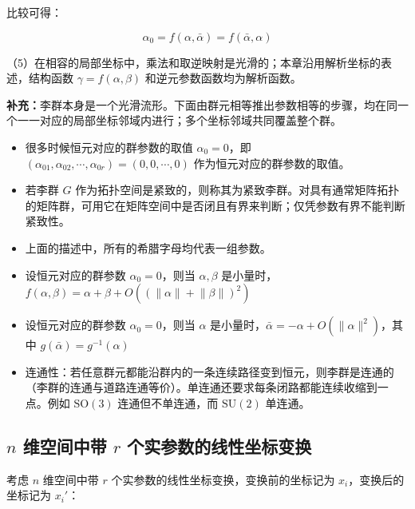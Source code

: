 比较可得：

\begin{equation}
\alpha_0
=f\left(\alpha,\bar{\alpha}\right)
=f\left(\bar{\alpha},\alpha\right)
\end{equation}

（5）在相容的局部坐标中，乘法和取逆映射是光滑的；本章沿用解析坐标的表述，结构函数 $\gamma=f\left(\alpha,\beta\right)$ 和逆元参数函数均为解析函数。

\textbf{补充：}李群本身是一个光滑流形。下面由群元相等推出参数相等的步骤，均在同一个一一对应的局部坐标邻域内进行；多个坐标邻域共同覆盖整个群。 

\begin{itemize}
\item 很多时候恒元对应的群参数的取值 $\alpha_0=0$，即 $\left(\alpha_{01},\alpha_{02},\cdots,\alpha_{0r}\right)=\left(0,0,\cdots,0\right)$ 作为恒元对应的群参数的取值。

\item 若李群 $G$ 作为拓扑空间是紧致的，则称其为紧致李群。对具有通常矩阵拓扑的矩阵群，可用它在矩阵空间中是否闭且有界来判断；仅凭参数有界不能判断紧致性。

\item 上面的描述中，所有的希腊字母均代表一组参数。

\item 设恒元对应的群参数 $\alpha_0=0$，则当 $\alpha,\beta$ 是小量时，$f\left(\alpha,\beta\right)=\alpha+\beta+O\left(\left(\lVert\alpha\rVert+\lVert\beta\rVert\right)^2\right)$

\item 设恒元对应的群参数 $\alpha_0=0$，则当 $\alpha$ 是小量时，$\bar{\alpha}=-\alpha+O\left(\lVert\alpha\rVert^2\right)$，其中 $g\left(\bar{\alpha}\right)=g^{-1}\left(\alpha\right)$

\item 连通性：若任意群元都能沿群内的一条连续路径变到恒元，则李群是连通的（李群的连通与道路连通等价）。单连通还要求每条闭路都能连续收缩到一点。例如 $\mathrm{SO}\left(3\right)$ 连通但不单连通，而 $\mathrm{SU}\left(2\right)$ 单连通。

\end{itemize}
\subsection{\texorpdfstring{$n$ 维空间中带 $r$ 个实参数的线性坐标变换}{n 维空间中带 r 个实参数的线性坐标变换}}

考虑 $n$ 维空间中带 $r$ 个实参数的线性坐标变换，变换前的坐标记为 $x_i$，变换后的坐标记为 $x_i'$：

